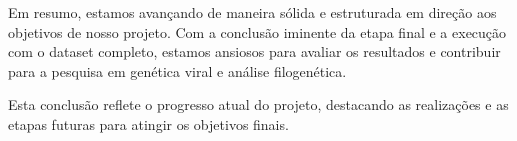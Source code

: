Em resumo, estamos avançando de maneira sólida e estruturada em direção aos objetivos de nosso projeto. Com a conclusão iminente da etapa final e a execução com o dataset completo, estamos ansiosos para avaliar os resultados e contribuir para a pesquisa em genética viral e análise filogenética.

Esta conclusão reflete o progresso atual do projeto, destacando as realizações e as etapas futuras para atingir os objetivos finais.







